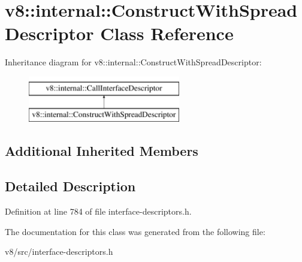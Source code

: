 \hypertarget{classv8_1_1internal_1_1ConstructWithSpreadDescriptor}{}\section{v8\+:\+:internal\+:\+:Construct\+With\+Spread\+Descriptor Class Reference}
\label{classv8_1_1internal_1_1ConstructWithSpreadDescriptor}
Inheritance diagram for v8\+:\+:internal\+:\+:Construct\+With\+Spread\+Descriptor\+:\begin{figure}[H]
\begin{center}
\leavevmode
\includegraphics[height=2.000000cm]{classv8_1_1internal_1_1ConstructWithSpreadDescriptor}
\end{center}
\end{figure}
\subsection*{Additional Inherited Members}


\subsection{Detailed Description}


Definition at line 784 of file interface-\/descriptors.\+h.



The documentation for this class was generated from the following file\+:\begin{DoxyCompactItemize}
\item 
v8/src/interface-\/descriptors.\+h\end{DoxyCompactItemize}
